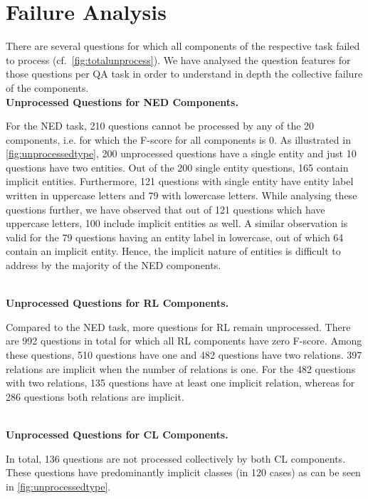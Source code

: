 \documentclass[sigconf,edbt]{acmart-edbt2019}
\begin{document}
\section{Failure Analysis} \label{sec:failure}
There are several questions for which all components of the respective task failed to process (cf.\ \autoref{fig:totalunprocess}). We have analysed the question features for those questions per QA task in order to understand in depth the collective failure of the components. 
~\\
{\bf Unprocessed Questions for NED Components.} \begin{inparaenum}
For the NED task, 210 questions cannot be processed by any of the 20 components, i.e. for which the F-score for all components is 0. As illustrated in \autoref{fig:unprocessedtype}, 200 unprocessed questions have a single entity and just 10 questions have two entities. Out of the 200 single entity questions, 165 contain implicit entities. Furthermore, 121 questions with single entity have entity label written in uppercase letters and 79 with lowercase letters. While analysing these questions further, we have observed that out of 121 questions which have uppercase letters, 100 include implicit entities as well. A similar observation is valid for the 79 questions having an entity label in lowercase, out of which 64 contain an implicit entity. Hence, the implicit nature of entities is difficult to address by the majority of the NED components.
\end{inparaenum}
~\\
{\bf Unprocessed Questions for RL Components.} \begin{inparaenum}
Compared to the NED task, more questions for RL remain unprocessed. There are 992 questions in total for which all RL components have zero F-score. Among these questions, 510 questions have one and 482 questions have two relations. 397 relations are implicit when the number of relations is one. For the 482 questions with two relations, 135 questions have at least one implicit relation, whereas for 286 questions both relations are implicit.
\end{inparaenum}
~\\
{\bf Unprocessed Questions for CL Components.} \begin{inparaenum}
In total, 136 questions are not processed collectively by both CL components. These questions have predominantly implicit classes (in 120 cases) as can be seen in \autoref{fig:unprocessedtype}.
\end{inparaenum}
\end{document}
